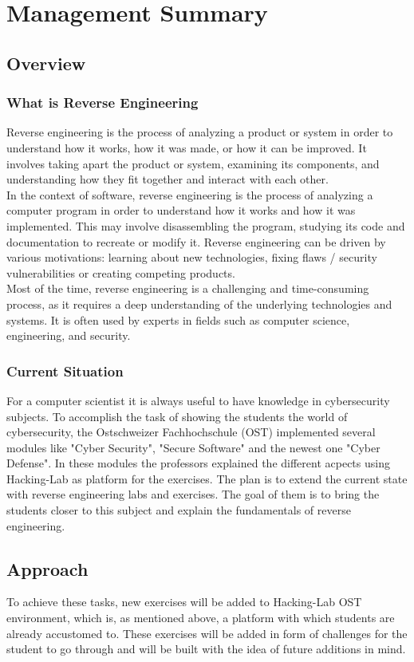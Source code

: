 \chapter{Management Summary}
\section{Overview}
\subsection{What is Reverse Engineering}
Reverse engineering is the process of analyzing a product or system in order to understand how it works, how it was made, or how it can be improved. It involves taking apart the product or system, examining its components, and understanding how they fit together and interact with each other. \\
In the context of software, reverse engineering is the process of analyzing a computer program in order to understand how it works and how it was implemented. This may involve disassembling the program, studying its code and documentation to recreate or modify it. Reverse engineering can be driven by various motivations: learning about new technologies, fixing flaws / security vulnerabilities or creating competing products. \\  
Most of the time, reverse engineering is a challenging and time-consuming process, as it requires a deep understanding of the underlying technologies and systems. It is often used by experts in fields such as computer science, engineering, and security. 

\subsection{Current Situation}
For a computer scientist it is always useful to have knowledge in cybersecurity subjects. To accomplish the task of showing the students the world of cybersecurity, the Ostschweizer Fachhochschule (OST) implemented several modules like "Cyber Security", "Secure Software" and the newest one "Cyber Defense". In these modules the professors explained the different acpects using Hacking-Lab as platform for the exercises. The plan is to extend the current state with reverse engineering labs and exercises. The goal of them is to bring the students closer to this subject and explain the fundamentals of reverse engineering.

\section{Approach}
To achieve these tasks, new exercises will be added to Hacking-Lab OST environment, which is, as mentioned above, a platform with which students are already accustomed to. These exercises will be added in form of challenges for the student to go through and will be built with the idea of future additions in mind.

